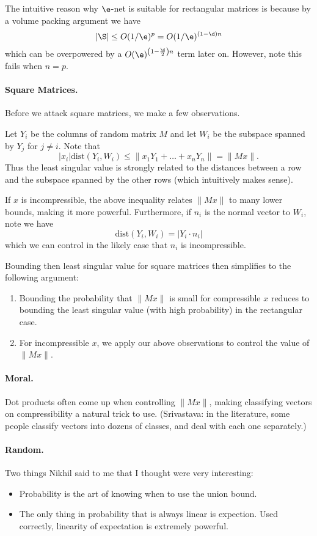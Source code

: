The intuitive reason why $\e$-net is suitable for rectangular matrices is because by a volume packing argument we have
\[
    |\S| \le O(1/\e)^p = O(1/\e)^{(1 - \d)n}
\]
which can be overpowered by a $O(\e)^{\left( 1 - \frac{\d}{2} \right)n}$ term later on. However, note this fails when $n = p$.

\paragraph{Square Matrices.} Before we attack square matrices, we make a few observations.

Let $Y_i$ be the columns of random matrix $M$ and let $W_i$ be the subspace spanned by $Y_j$ for $j \neq i$. Note that
\[
    |x_i|\text{dist}\left( Y_i, W_i \right) \le \|x_1Y_1 + \dots + x_nY_n\| = \|Mx\|.
\]
Thus the least singular value is strongly related to the distances between a row and the subspace spanned by the other rows (which intuitively makes sense).

If $x$ is incompressible, the above inequality relates $\|Mx\|$ to many lower bounds, making it more powerful. Furthermore, if $n_i$ is the normal vector to $W_i$, note we have
\[
    \text{dist}\left( Y_i, W_i \right) = |Y_i \cdot n_i|
\]
which we can control in the likely case that $n_i$ is incompressible.

Bounding then least singular value for square matrices then simplifies to the following argument:
\begin{enumerate}
    \item Bounding the probability that $\|Mx\|$ is small for compressible $x$ reduces to bounding the least singular value (with high probability) in the rectangular case.
    \item For incompressible $x$, we apply our above observations to control the value of $\|Mx\|$.
\end{enumerate}

\paragraph{Moral.} Dot products often come up when controlling $\|Mx\|$, making classifying vectors on compressibility a natural trick to use. (Srivastava: in the literature, some people classify vectors into dozens of classes, and deal with each one separately.)

\paragraph{Random.} Two things Nikhil said to me that I thought were very interesting:
\begin{itemize}
    \item Probability is the art of knowing when to use the union bound.
    \item The only thing in probability that is always linear is expection. Used correctly, linearity of expectation is extremely powerful.
\end{itemize}

